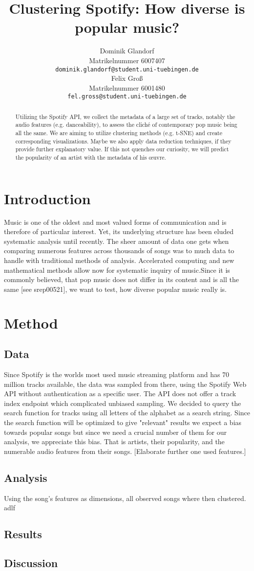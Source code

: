 \documentclass{article}
\title{Clustering Spotify: How diverse is popular music?}
\author{%
  Dominik Glandorf\\
  Matrikelnummer 6007407\\
  \texttt{dominik.glandorf@student.uni-tuebingen.de} \\
  \And
  Felix Groß\\
  Matrikelnummer 6001480\\
  \texttt{fel.gross@student.uni-tuebingen.de} \\
}
\begin{document}
\maketitle

\begin{abstract}
{Utilizing the Spotify API, we collect the metadata of a large set of tracks, notably the audio features (e.g. danceability), to assess the cliché of contemporary pop music being all the same.  
  We are aiming to utilize clustering methods (e.g. t-SNE) and create corresponding visualizations. Maybe we also apply data reduction techniques, if they provide further explanatory value. If this not quenches our curiosity, we will predict the popularity of an artist with the metadata of his œuvre.}
\end{abstract}

\section{Introduction}

Music is one of the oldest and most valued forms of communication and is therefore of particular interest. Yet, its underlying structure has been eluded systematic analysis until recently. The sheer amount of data one gets when comparing numerous features across thousands of songs was to much data to handle with traditional methods of analysis. Accelerated computing and new mathematical methods allow now for systematic inquiry of music.\newline Since it is commonly believed, that pop music does not differ in its content and is all the same [see srep00521], we want  to test, how diverse popular music really is. 

\section{Method}

\subsection{Data}
Since Spotify is the worlds most used music streaming platform and has 70 million tracks available, the data was sampled from there, using the Spotify Web API without authentication as a specific user. The API does not offer a track index endpoint which complicated unbiased sampling. We decided to query the search function for tracks using all letters of the alphabet as a search string. Since the search function will be optimized to give "relevant" results we expect a bias towards popular songs but since we need a crucial number of them for our analysis, we appreciate this bias. That is artists, their popularity, and the numerable audio features from their songs. 
[Elaborate further one used features.]

\subsection{Analysis}
Using the song's features as dimensions, all observed songs where then clustered. \cite{latex2e} adlf

\subsection{Results}

\subsection{Discussion}
\end{document}
